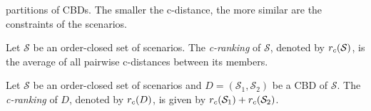 partitions of CBDs.
The smaller the c-distance, the more similar are the constraints
of the scenarios.
\begin{definition}
\label{def-c-set-ranking}
Let $\mathcal{S}$ be an order-closed set of scenarios.
The \emph{c-ranking} of ${\mathcal{S}}$, denoted by $r_c(\mathcal{S})$,
is the average of all pairwise c-distances between its members.
\end{definition}
\begin{definition}
\label{def-c-ranking}
Let $\mathcal{S}$ be an order-closed set of scenarios and
$D=(\mathcal{S}_1,\mathcal{S}_2)$ be a CBD of
$\mathcal{S}$. The \emph{c-ranking} of $D$, denoted by
$r_c(D)$, is given by
$r_c(\mathcal{S}_1)+r_c(\mathcal{S}_2)$.
\end{definition}
